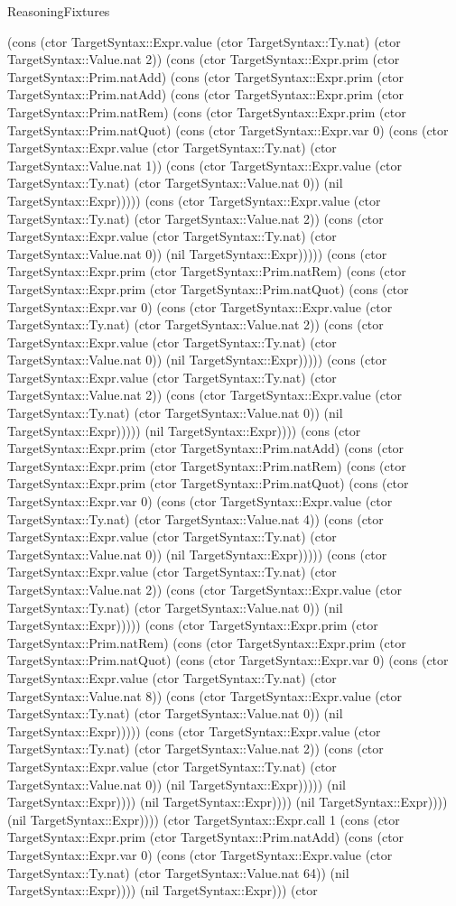 \begin{lexlean}{ReasoningFixtures}
\begin{semanticmodule}
{(cons (ctor TargetSyntax::Expr.value (ctor TargetSyntax::Ty.nat) (ctor TargetSyntax::Value.nat 2)) (cons (ctor TargetSyntax::Expr.prim (ctor TargetSyntax::Prim.natAdd) (cons (ctor TargetSyntax::Expr.prim (ctor TargetSyntax::Prim.natAdd) (cons (ctor TargetSyntax::Expr.prim (ctor TargetSyntax::Prim.natRem) (cons (ctor TargetSyntax::Expr.prim (ctor TargetSyntax::Prim.natQuot) (cons (ctor TargetSyntax::Expr.var 0) (cons (ctor TargetSyntax::Expr.value (ctor TargetSyntax::Ty.nat) (ctor TargetSyntax::Value.nat 1)) (cons (ctor TargetSyntax::Expr.value (ctor TargetSyntax::Ty.nat) (ctor TargetSyntax::Value.nat 0)) (nil TargetSyntax::Expr))))) (cons (ctor TargetSyntax::Expr.value (ctor TargetSyntax::Ty.nat) (ctor TargetSyntax::Value.nat 2)) (cons (ctor TargetSyntax::Expr.value (ctor TargetSyntax::Ty.nat) (ctor TargetSyntax::Value.nat 0)) (nil TargetSyntax::Expr))))) (cons (ctor TargetSyntax::Expr.prim (ctor TargetSyntax::Prim.natRem) (cons (ctor TargetSyntax::Expr.prim (ctor TargetSyntax::Prim.natQuot) (cons (ctor TargetSyntax::Expr.var 0) (cons (ctor TargetSyntax::Expr.value (ctor TargetSyntax::Ty.nat) (ctor TargetSyntax::Value.nat 2)) (cons (ctor TargetSyntax::Expr.value (ctor TargetSyntax::Ty.nat) (ctor TargetSyntax::Value.nat 0)) (nil TargetSyntax::Expr))))) (cons (ctor TargetSyntax::Expr.value (ctor TargetSyntax::Ty.nat) (ctor TargetSyntax::Value.nat 2)) (cons (ctor TargetSyntax::Expr.value (ctor TargetSyntax::Ty.nat) (ctor TargetSyntax::Value.nat 0)) (nil TargetSyntax::Expr))))) (nil TargetSyntax::Expr)))) (cons (ctor TargetSyntax::Expr.prim (ctor TargetSyntax::Prim.natAdd) (cons (ctor TargetSyntax::Expr.prim (ctor TargetSyntax::Prim.natRem) (cons (ctor TargetSyntax::Expr.prim (ctor TargetSyntax::Prim.natQuot) (cons (ctor TargetSyntax::Expr.var 0) (cons (ctor TargetSyntax::Expr.value (ctor TargetSyntax::Ty.nat) (ctor TargetSyntax::Value.nat 4)) (cons (ctor TargetSyntax::Expr.value (ctor TargetSyntax::Ty.nat) (ctor TargetSyntax::Value.nat 0)) (nil TargetSyntax::Expr))))) (cons (ctor TargetSyntax::Expr.value (ctor TargetSyntax::Ty.nat) (ctor TargetSyntax::Value.nat 2)) (cons (ctor TargetSyntax::Expr.value (ctor TargetSyntax::Ty.nat) (ctor TargetSyntax::Value.nat 0)) (nil TargetSyntax::Expr))))) (cons (ctor TargetSyntax::Expr.prim (ctor TargetSyntax::Prim.natRem) (cons (ctor TargetSyntax::Expr.prim (ctor TargetSyntax::Prim.natQuot) (cons (ctor TargetSyntax::Expr.var 0) (cons (ctor TargetSyntax::Expr.value (ctor TargetSyntax::Ty.nat) (ctor TargetSyntax::Value.nat 8)) (cons (ctor TargetSyntax::Expr.value (ctor TargetSyntax::Ty.nat) (ctor TargetSyntax::Value.nat 0)) (nil TargetSyntax::Expr))))) (cons (ctor TargetSyntax::Expr.value (ctor TargetSyntax::Ty.nat) (ctor TargetSyntax::Value.nat 2)) (cons (ctor TargetSyntax::Expr.value (ctor TargetSyntax::Ty.nat) (ctor TargetSyntax::Value.nat 0)) (nil TargetSyntax::Expr))))) (nil TargetSyntax::Expr)))) (nil TargetSyntax::Expr)))) (nil TargetSyntax::Expr)))) (nil TargetSyntax::Expr)))) (ctor TargetSyntax::Expr.call 1 (cons (ctor TargetSyntax::Expr.prim (ctor TargetSyntax::Prim.natAdd) (cons (ctor TargetSyntax::Expr.var 0) (cons (ctor TargetSyntax::Expr.value (ctor TargetSyntax::Ty.nat) (ctor TargetSyntax::Value.nat 64)) (nil TargetSyntax::Expr)))) (nil TargetSyntax::Expr))) (ctor }
\end{semanticmodule}
\end{lexlean}
